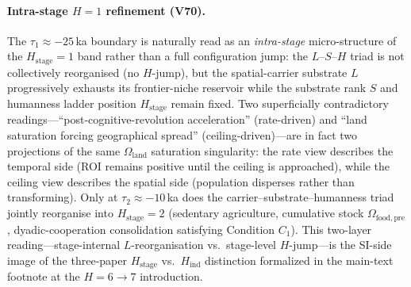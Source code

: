 \documentclass[11pt]{article}
\begin{document}
\paragraph{Intra-stage $H{=}1$ refinement (V70).} The $\tau_1\approx -25$\,ka boundary is naturally read as an \emph{intra-stage} micro-structure of the $H_{\mathrm{stage}}{=}1$ band rather than a full configuration jump: the $L$--$S$--$H$ triad is not collectively reorganised (no $H$-jump), but the spatial-carrier substrate $L$ progressively exhausts its frontier-niche reservoir while the substrate rank $S$ and humanness ladder position $H_{\mathrm{stage}}$ remain fixed. Two superficially contradictory readings---``post-cognitive-revolution acceleration'' (rate-driven) and ``land saturation forcing geographical spread'' (ceiling-driven)---are in fact two projections of the same $\Omega_{\mathrm{land}}$ saturation singularity: the rate view describes the temporal side (ROI remains positive until the ceiling is approached), while the ceiling view describes the spatial side (population disperses rather than transforming). Only at $\tau_2\approx -10$\,ka does the carrier--substrate--humanness triad jointly reorganise into $H_{\mathrm{stage}}{=}2$ (sedentary agriculture, cumulative stock $\Omega_{\mathrm{food,pre}}$, dyadic-cooperation consolidation satisfying Condition $C_1$). This two-layer reading---stage-internal $L$-reorganisation vs.\ stage-level $H$-jump---is the SI-side image of the three-paper $H_{\mathrm{stage}}$ vs.\ $H_{\mathrm{ind}}$ distinction formalized in the main-text footnote at the $H{=}6\to 7$ introduction.
\end{document}
